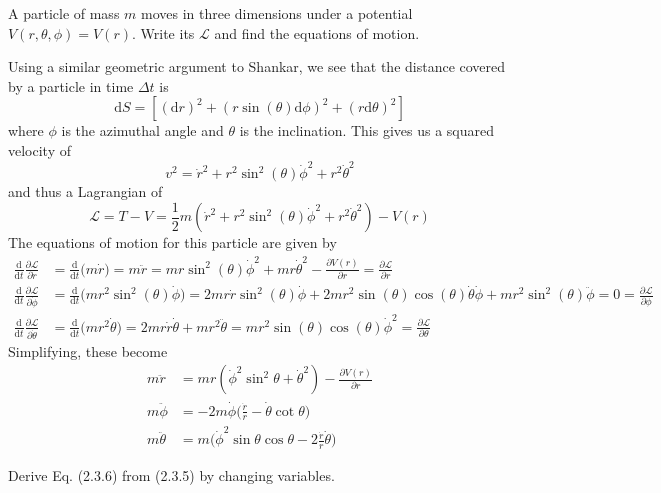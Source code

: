 \documentclass[../principles-of-quantum-mechanics.tex]{subfiles}
\begin{document}
\begin{questions}
		\question A particle of mass $m$ moves in three dimensions under a potential $V(r, \theta, \phi) = V(r)$. Write its $\mathcal{L}$ and find the equations of motion.
		
		\begin{solution}
			Using a similar geometric argument to Shankar, we see that the distance covered by a particle in time $\Delta{t}$ is
			\[
				\mathrm{d}S = [(\mathrm{d}r)^2 + (r\sin(\theta)\mathrm{d}\phi)^2 + (r\mathrm{d}\theta)^2]
			\]
			where $\phi$ is the azimuthal angle and $\theta$ is the inclination. This gives us a squared velocity of
			\[
				v^2 = \dot{r}^2 + r^2\sin^2(\theta)\dot{\phi}^2 + r^2\dot{\theta}^2
			\]
			and thus a Lagrangian of
			\[
				\mathcal{L} = T - V = \frac{1}{2}m(\dot{r}^2 + r^2\sin^2(\theta)\dot{\phi}^2 + r^2\dot{\theta}^2) - V(r)
			\]
			The equations of motion for this particle are given by
			\begin{align*}
			\frac{\mathrm{d}}{\mathrm{d}t}\frac{\partial\mathcal{L}}{\partial\dot{r}} &= \frac{\mathrm{d}}{\mathrm{d}t}\Big(m\dot{r}\Big) = m\ddot{r} = mr\sin^2(\theta)\dot{\phi}^2 + mr\dot{\theta}^2 - \frac{\partial{V(r)}}{\partial{r}} = \frac{\partial\mathcal{L}}{\partial{r}} \\
			\frac{\mathrm{d}}{\mathrm{d}t}\frac{\partial\mathcal{L}}{\partial\dot{\phi}} &= \frac{\mathrm{d}}{\mathrm{d}t}\Big(mr^2\sin^2(\theta)\dot{\phi}\Big) = 2mr\dot{r}\sin^2(\theta)\dot{\phi} + 2mr^2\sin(\theta)\cos(\theta)\dot{\theta}\dot{\phi} + mr^2\sin^2(\theta)\ddot{\phi} = 0 = \frac{\partial\mathcal{L}}{\partial{\phi}} \\
			\frac{\mathrm{d}}{\mathrm{d}t}\frac{\partial\mathcal{L}}{\partial\dot{\theta}} &= \frac{\mathrm{d}}{\mathrm{d}t}\Big(mr^2\dot{\theta}\Big) = 2mr\dot{r}\dot{\theta} + mr^2\ddot{\theta} = mr^2\sin(\theta)\cos(\theta)\dot{\phi}^2 =  \frac{\partial\mathcal{L}}{\partial{\theta}}
			\end{align*}
			Simplifying, these become
			\begin{align*}
				m\ddot{r} &= mr(\dot{\phi}^2\sin^2\theta + \dot{\theta}^2) - \frac{\partial{V}(r)}{\partial{r}} \\
				m\ddot{\phi} &= -2m\dot{\phi}\Big(\frac{\dot{r}}{r} - \dot{\theta}\cot\theta\Big) \\
				m\ddot{\theta} &= m\Big(\dot{\phi}^2\sin\theta\cos\theta  - 2\frac{\dot{r}}{r}\dot{\theta}\Big)
			\end{align*}
		\end{solution}
	
		\question Derive Eq. (2.3.6) from (2.3.5) by changing variables.
		

\end{questions}
\end{document}

